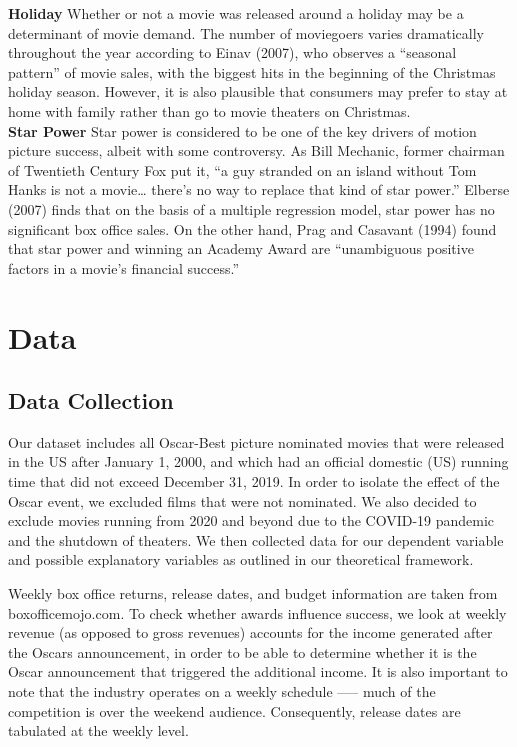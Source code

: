 \documentclass[10.7pt]{article} %
\begin{document}
\begin{adjustwidth}{1cm}{}
\textbf{Holiday}\newline
Whether or not a movie was released around a holiday may be a determinant of movie demand. The number of moviegoers varies dramatically throughout the year according to Einav (2007), who observes a “seasonal pattern” of movie sales, with the biggest hits in the beginning of the Christmas holiday season. However, it is also plausible that consumers may prefer to stay at home with family rather than go to movie theaters on Christmas. \\

\textbf{Star Power}\newline
Star power is considered to be one of the key drivers of motion picture success, albeit with some controversy. As Bill Mechanic, former chairman of Twentieth Century Fox put it, “a guy stranded on an island without Tom Hanks is not a movie… there's no way to replace that kind of star power.”  Elberse (2007) finds that on the basis of a multiple regression model, star power has no significant box office sales. On the other hand, Prag and Casavant (1994) found that star power and winning an Academy Award are “unambiguous positive factors in a movie’s financial success.” 
\end{adjustwidth}


\setlength{\parindent}{20pt}

\section{Data}
\subsection{Data Collection} 
Our dataset includes all Oscar-Best picture nominated movies that were released in the US after January 1, 2000, and which had an official domestic (US) running time that did not exceed December 31, 2019. In order to isolate the effect of the Oscar event, we excluded films that were not nominated. We also decided to exclude movies running from 2020 and beyond due to the COVID-19 pandemic and the shutdown of theaters. We then collected data for our dependent variable and possible explanatory variables as outlined in our theoretical framework. 

Weekly box office returns, release dates, and budget information are taken from boxofficemojo.com. To check whether awards influence success, we look at weekly revenue (as opposed to gross revenues) accounts for the income generated after the Oscars announcement, in order to be able to determine whether it is the Oscar announcement that triggered the additional income. It is also important to note that the industry operates on a weekly schedule --— much of the competition is over the weekend audience. Consequently, release dates are tabulated at the weekly level. 
\end{document}
